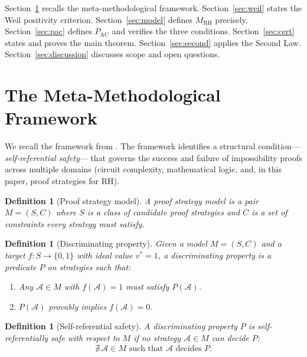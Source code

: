 \documentclass[12pt]{article}
\newtheorem{definition}[theorem]{Definition}
\newcommand{\MRH}{M_{\mathrm{RH}}}
\newcommand{\PAC}{P_{\mathrm{AC}}}
\begin{document}
Section~\ref{sec:framework} recalls the meta-methodological framework.
Section~\ref{sec:weil} states the Weil positivity criterion.
Section~\ref{sec:model} defines $\MRH$ precisely.
Section~\ref{sec:pac} defines $\PAC$ and verifies the three conditions.
Section~\ref{sec:cert} states and proves the main theorem.
Section~\ref{sec:second} applies the Second Law.
Section~\ref{sec:discussion} discusses scope and open questions.

\section{The Meta-Methodological Framework}
\label{sec:framework}

We recall the framework from \cite{metamethod2026}. The framework
identifies a structural condition---\emph{self-referential safety}---
that governs the success and failure of impossibility proofs across
multiple domains (circuit complexity, mathematical logic, and, in this
paper, proof strategies for RH).

\begin{definition}[Proof strategy model]
A \emph{proof strategy model} is a pair $M = (S, C)$ where $S$ is a
class of candidate proof strategies and $C$ is a set of constraints
every strategy must satisfy.
\end{definition}

\begin{definition}[Discriminating property]
\label{def:discrim}
Given a model $M = (S,C)$ and a target $f: S \to \{0,1\}$ with ideal
value $v^* = 1$, a \emph{discriminating property} is a predicate $P$
on strategies such that:
\begin{enumerate}
\item[\textup{(Necessity)}] Any $\mathcal{A} \in M$ with
  $f(\mathcal{A}) = 1$ must satisfy $P(\mathcal{A})$.
\item[\textup{(Conflict)}] $P(\mathcal{A})$ provably implies
  $f(\mathcal{A}) = 0$.
\end{enumerate}
\end{definition}

\begin{definition}[Self-referential safety]
\label{def:safety}
A discriminating property $P$ is \emph{self-referentially safe} with
respect to $M$ if no strategy $\mathcal{A} \in M$ can decide $P$:
\[
\nexists\, \mathcal{A} \in M \text{ such that } \mathcal{A}
\text{ decides } P.
\]
\end{definition}
\end{document}
